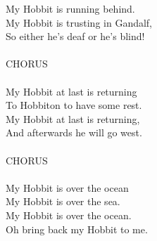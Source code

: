 \begin{multicols}{2}
My Hobbit is running behind.
\\
My Hobbit is trusting in Gandalf,
\\
So either he’s deaf or he’s blind!
\\
\\
CHORUS
\\
\\
My Hobbit at last is returning
\\
To Hobbiton to have some rest.
\\
My Hobbit at last is returning,
\\
And afterwards he will go west.
\\
\\
CHORUS
\\
\\
My Hobbit is over the ocean
\\
My Hobbit is over the sea. 
\\
My Hobbit is over the ocean. 
\\
Oh bring back my Hobbit to me.
\end{multicols}